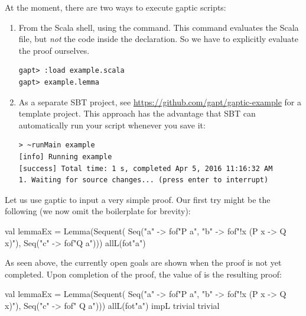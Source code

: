 \documentclass[a4paper,11pt]{article}
\newcommand{\cli}[1]{{\ttfamily {#1}}}
\begin{document}
At the moment, there are two ways to execute gaptic scripts:
\begin{enumerate}

  \item From the Scala shell, using the \cli{:load} command.  This command
    evaluates the Scala file, but \emph{not} the code inside the \cli{object}
    declaration.  So we have to explicitly evaluate the proof ourselves.
\begin{lstlisting}
gapt> :load example.scala
gapt> example.lemma
\end{lstlisting}

  \item As a separate SBT project, see
    \url{https://github.com/gapt/gaptic-example} for a template project.  This
approach has the advantage that SBT can automatically run your script whenever
you save it:
\begin{lstlisting}
> ~runMain example
[info] Running example 
[success] Total time: 1 s, completed Apr 5, 2016 11:16:32 AM
1. Waiting for source changes... (press enter to interrupt)
\end{lstlisting}

\end{enumerate}

Let us use gaptic to input a very simple proof.  Our first try might be the
following (we now omit the boilerplate for brevity):
\begin{tacticslisting}
val lemmaEx =
  Lemma(Sequent(
      Seq("a" -> fof"P a", "b" -> fof"!x (P x -> Q x)"),
      Seq("c" -> fof"Q a"))) {
    allL(fot"a")
  }
\end{tacticslisting}

As seen above, the currently open goals are shown when the proof is not yet
completed. Upon completion of the proof, the value of \cli{lemmaEx} is the
resulting proof:
\begin{tacticslisting}
val lemmaEx =
  Lemma(Sequent(
      Seq("a" -> fof"P a", "b" -> fof"!x (P x -> Q x)"),
      Seq("c" -> fof" Q a"))) {
    allL(fot"a")
    impL
    trivial
    trivial
  }
\end{tacticslisting}
\begin{tacticsoutput}
\end{tacticsoutput}
\end{document}
